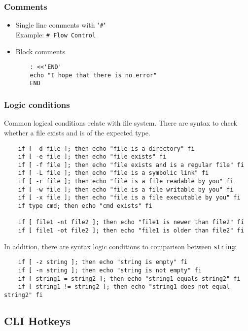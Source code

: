 \subsubsection{Comments}
\begin{itemize}
	\setlength\itemsep{0em}
	\item Single line comments with "\verb|#|"\\
	Example: \verb|# Flow Control|
	\item Block comments
	\begin{verbatim}
	: <<'END'
	echo "I hope that there is no error"
	END
	\end{verbatim}
\end{itemize}

\subsubsection{Logic conditions}

Common logical conditions relate with file system. There are syntax to check whether a file exists and is of the expected type.

\begin{verbatim}
	if [ -d file ]; then echo "file is a directory" fi
	if [ -e file ]; then echo "file exists" fi
	if [ -f file ]; then echo "file exists and is a regular file" fi
	if [ -L file ]; then echo "file is a symbolic link" fi
	if [ -r file ]; then echo "file is a file readable by you" fi
	if [ -w file ]; then echo "file is a file writable by you" fi
	if [ -x file ]; then echo "file is a file executable by you" fi
	if type cmd; then echo "cmd exists" fi
	
	if [ file1 -nt file2 ]; then echo "file1 is newer than file2" fi
	if [ file1 -ot file2 ]; then echo "file1 is older than file2" fi
\end{verbatim}

In addition, there are syntax logic conditions to comparison between \texttt{string}:
\begin{verbatim}
	if [ -z string ]; then echo "string is empty" fi
	if [ -n string ]; then echo "string is not empty" fi
	if [ string1 = string2 ]; then echo "string1 equals string2" fi
	if [ string1 != string2 ]; then echo "string1 does not equal string2" fi
\end{verbatim}

\subsection{CLI Hotkeys}

